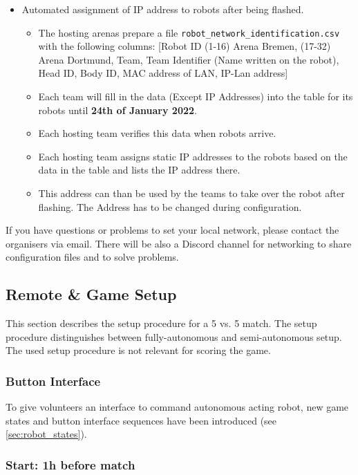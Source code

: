 \begin{itemize}
\begin{itemize}
    \end{itemize}
    \item Automated assignment of IP address to robots after being flashed.
    \begin{itemize}
        \item \label{sec:robot_table} The hosting arenas prepare a file \texttt{robot\_network\_identification.csv} with the following columns: [Robot ID (1-16) Arena Bremen, (17-32) Arena Dortmund, Team, Team Identifier (Name written on the robot), Head ID, Body ID, MAC address of LAN, IP-Lan address] 
        \item Each team will fill in the data (Except IP Addresses) into the table for its robots until \textbf{24th of January 2022}.
        \item Each hosting team verifies this data when robots arrive.
        \item Each hosting team assigns static IP addresses to the robots based on the data in the table and lists the IP address there.
        \item This address can than be used by the teams to take over the robot after flashing. The Address has to be changed during configuration.
    \end{itemize}
\end{itemize}

If you have questions or problems to set your local network, please contact the organisers via email. There will be also a Discord channel for networking to share configuration files and to solve problems.

\subsection{Remote \& Game Setup}
\label{sec:remote_game_setup}
This section describes the setup procedure for a 5 vs. 5 match. The setup procedure distinguishes between fully-autonomous and semi-autonomous setup. The used setup procedure is not relevant for scoring the game.

\subsubsection{Button Interface}
To give volunteers an interface to command autonomous acting robot, new game states and button interface sequences have been introduced (see \ref{sec:robot_states}).

\subsubsection{Start: 1h before match}
\label{sec:setup_two_hours}


